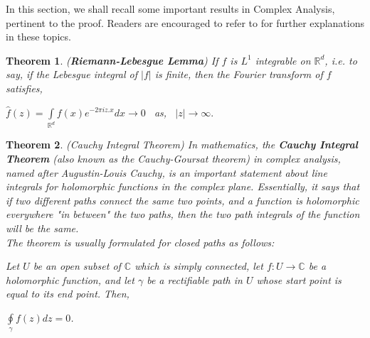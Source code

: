 \documentclass[article,12pt]{elsarticle}
\newtheorem{thm}{Theorem}[section]
\begin{document}
	In this section, we shall recall some important results in Complex Analysis, pertinent to the proof. Readers are encouraged to refer to \cite{2} for further explanations in these topics.
	\begin{thm}\label{thm4}
		(\textbf{Riemann-Lebesgue Lemma})  If $f$ is $ L^{1}$ integrable on $\mathbb{R}^{d}$, i.e. to say, if the Lebesgue integral of $|f|$ is finite, then the Fourier transform of $f$ satisfies,
		\begin{center}
			$\hat{f}(z) = \int\limits_{\mathbb{R}^{d}} f(x) e^{-2\pi iz.x} dx \rightarrow 0$  as,   $ |z| \rightarrow \infty .$
		\end{center}
	\end{thm}
	\begin{thm}\label{thm5}
		(Cauchy Integral Theorem)  In mathematics, the \textbf{Cauchy Integral Theorem} (also known as the \textit{Cauchy-Goursat theorem}) in complex analysis, named after \textit{Augustin-Louis Cauchy}, is an important statement about line integrals for holomorphic functions in the complex plane. Essentially, it says that if two different paths connect the same two points, and a function is holomorphic everywhere "in between" the two paths, then the two path integrals of the function will be the same.\\
		The theorem is usually formulated for closed paths as follows:
		\begin{center}
			Let $U$ be an open subset of $\mathbb{C}$ which is simply connected, let $f : U \rightarrow \mathbb{C}$ be a \textit{holomorphic function}, and let $\gamma$ be a rectifiable path in $U$ whose start point is equal to its end point. Then,
			\begin{center}
				$\oint\limits_{\gamma}f(z)dz=0$.
			\end{center}
		\end{center}
	\end{thm}
\end{document}
